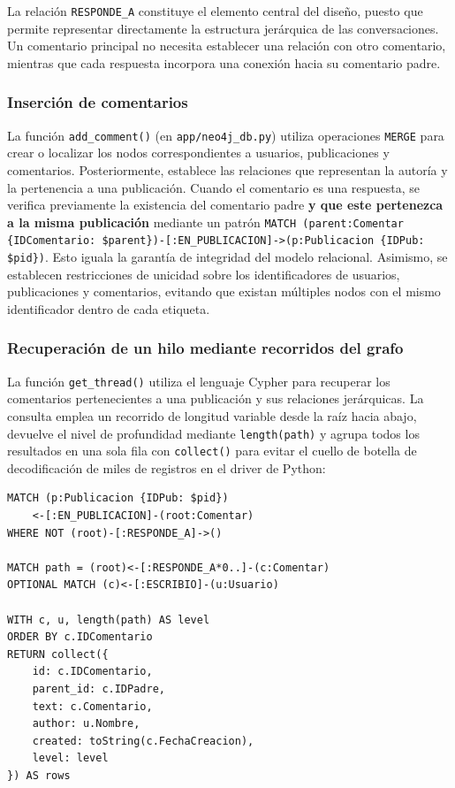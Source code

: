 \documentclass[11pt, a4paper]{article}
\begin{document}
La relación \texttt{RESPONDE\_A} constituye el elemento central del diseño, puesto que permite representar directamente la estructura jerárquica de las conversaciones. Un comentario principal no necesita establecer una relación con otro comentario, mientras que cada respuesta incorpora una conexión hacia su comentario padre.

\subsubsection{Inserción de comentarios}
La función \texttt{add\_comment()} (en \texttt{app/neo4j\_db.py}) utiliza operaciones \texttt{MERGE} para crear o localizar los nodos correspondientes a usuarios, publicaciones y comentarios. Posteriormente, establece las relaciones que representan la autoría y la pertenencia a una publicación. Cuando el comentario es una respuesta, se verifica previamente la existencia del comentario padre \textbf{y que este pertenezca a la misma publicación} mediante un patrón \texttt{MATCH (parent:Comentar \{IDComentario: \$parent\})-[:EN\_PUBLICACION]->(p:Publicacion \{IDPub: \$pid\})}. Esto iguala la garantía de integridad del modelo relacional. Asimismo, se establecen restricciones de unicidad sobre los identificadores de usuarios, publicaciones y comentarios, evitando que existan múltiples nodos con el mismo identificador dentro de cada etiqueta.

\subsubsection{Recuperación de un hilo mediante recorridos del grafo}
La función \texttt{get\_thread()} utiliza el lenguaje Cypher para recuperar los comentarios pertenecientes a una publicación y sus relaciones jerárquicas. La consulta emplea un recorrido de longitud variable desde la raíz hacia abajo, devuelve el nivel de profundidad mediante \texttt{length(path)} y agrupa todos los resultados en una sola fila con \texttt{collect()} para evitar el cuello de botella de decodificación de miles de registros en el driver de Python:

\begin{lstlisting}
MATCH (p:Publicacion {IDPub: $pid})
    <-[:EN_PUBLICACION]-(root:Comentar)
WHERE NOT (root)-[:RESPONDE_A]->()

MATCH path = (root)<-[:RESPONDE_A*0..]-(c:Comentar)
OPTIONAL MATCH (c)<-[:ESCRIBIO]-(u:Usuario)

WITH c, u, length(path) AS level
ORDER BY c.IDComentario
RETURN collect({
    id: c.IDComentario,
    parent_id: c.IDPadre,
    text: c.Comentario,
    author: u.Nombre,
    created: toString(c.FechaCreacion),
    level: level
}) AS rows
\end{lstlisting}
\end{document}
